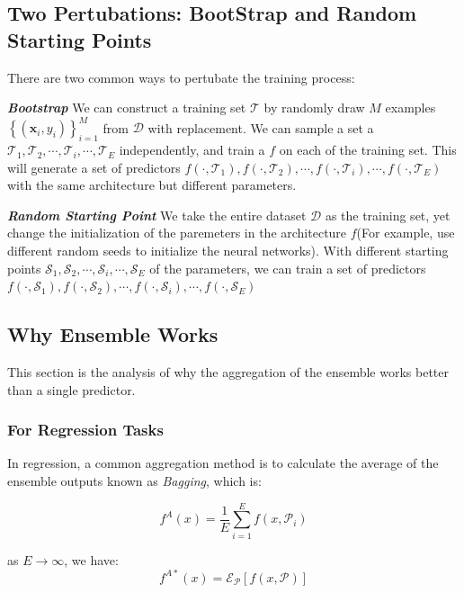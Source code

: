 \documentclass{article}
\begin{document}
\subsection{Two Pertubations: BootStrap and Random Starting Points}
There are two common ways to pertubate the training process:

\textit{\textbf{Bootstrap}} We can construct a training set $\mathcal{T}$ by randomly draw $M$ examples $\left\{\left( \textbf{x}_i ,y_i\right)\right\}_{i=1}^M $ from $\mathcal{D}$ with replacement. We can sample a set a $\mathcal{T}_1,\mathcal{T}_2,\cdots,\mathcal{T}_i,\cdots,\mathcal{T}_E$ independently, and train a $f$ on each of the training set.
This will generate a set of predictors $f \left(\cdot , \mathcal{T}_1\right), f \left(\cdot , \mathcal{T}_2\right),\cdots, f \left(\cdot , \mathcal{T}_i\right),\cdots,f \left(\cdot , \mathcal{T}_E\right) $ with the same architecture but different parameters.

\textit{\textbf{Random Starting Point}} We take the entire dataset $\mathcal{D}$ as the training set, yet change the initialization of the paremeters in the architecture $f$(For example, use different random seeds to initialize the neural networks). With different starting points $\mathcal{S}_1,\mathcal{S}_2,\cdots,\mathcal{S}_i,\cdots,\mathcal{S}_E$ of the parameters, we can train a set of predictors $f \left(\cdot , \mathcal{S}_1\right), f \left(\cdot , \mathcal{S}_2\right),\cdots, f \left(\cdot , \mathcal{S}_i\right),\cdots,f \left(\cdot , \mathcal{S}_E\right) $



\subsection{Why Ensemble Works}
This section is the analysis of why the aggregation of the ensemble works better than a single predictor.
\subsubsection{For Regression Tasks}
In regression, a common aggregation method is to calculate the average of the ensemble outputs known as \textit{Bagging}, which is:

\begin{equation}
    f^A\left(x\right) = \frac{1}{E}\sum_{i=1}^{E} f\left(x,\mathcal{P}_i\right)
\end{equation}

as $E\rightarrow\infty$, we have:
\begin{equation}
    f^{A*}\left(x\right) = \mathcal{E}_\mathcal{P}\left[f\left(x,\mathcal{P}\right)\right]
\end{equation}
\end{document}
